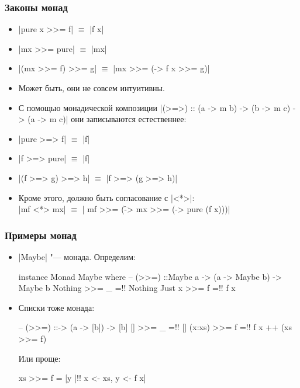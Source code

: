 \documentclass[11pt]{beamer}
\begin{document}
\begin{frame}[fragile]
  \frametitle{Законы монад}
  \begin{itemize}
    \item \haskinline|pure x >>= f| $\equiv$ \haskinline|f x|
    \item \haskinline|mx >>= pure| $\equiv$ \haskinline|mx|
    \item \haskinline|(mx >>= f) >>= g| $\equiv$ \haskinline|mx >>= (\x -> f x >>= g)|
    \item Может быть, они не совсем интуитивны.
          \pause
    \item С помощью монадической композиции \haskinline|(>=>) :: (a -> m b) -> (b -> m c) -> (a -> m c)| они записываются естественнее:
    \item \haskinline|pure >=> f| $\equiv$ \haskinline|f|
    \item \haskinline|f >=> pure| $\equiv$ \haskinline|f|
    \item \haskinline|(f >=> g) >=> h| $\equiv$ \haskinline|f >=> (g >=> h)| \pause
    \item Кроме этого, должно быть согласование с \haskinline|<*>|: \\
          \haskinline|mf <*> mx| $\equiv$ \haskinline|  mf >>= (\f -> mx >>= (\x -> pure (f x)))|
  \end{itemize}
\end{frame}

\begin{frame}[fragile]
  \frametitle{Примеры монад}
  \begin{itemize}[<+->]
    \item \haskinline|Maybe| "--- монада. Определим:
          \begin{haskell}
            instance Monad Maybe where
              -- (>{}>=) ::\pause Maybe a -> (a -> Maybe b) -> Maybe b
              Nothing >>= _ =!\pause! Nothing
              Just x  >>= f =!\pause! f x
          \end{haskell}
    \item Списки тоже монада:
          \begin{haskell}
            -- (>{}>=) ::\pause [a] -> (a -> [b]) -> [b]
            []     >>= _ =!\pause! []
            (x:xs) >>= f =!\pause! f x ++ (xs >>= f)
          \end{haskell}
          Или проще:
          \begin{haskell}
            xs >>= f = [y |!\pause! x <- xs, y <- f x]
          \end{haskell}
  \end{itemize}
\end{frame}
\end{document}
